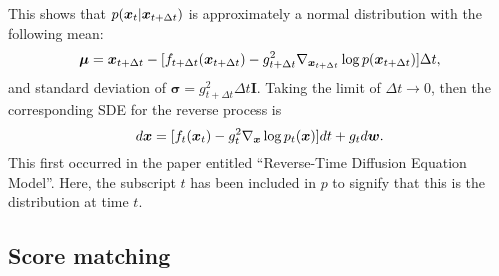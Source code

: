 This shows that $p(\bm{x}_{t}|\bm{x}_{t+\Delta t})$ is approximately a normal distribution with the following mean:
\begin{equation*}
    \bm{\mu}=\bm{x}_{t+\Delta t}-[f_{t+\Delta t}(\bm{x}_{t+\Delta t})-g_{t+\Delta t}^2 \nabla_{\bm{x}_{t+\Delta t}} \log p(\bm{x}_{t+\Delta t})]\Delta t,
\end{equation*}
and standard deviation of $\bm{\sigma}=g_{t+\Delta t}^2\Delta t\bm{I}$. Taking the limit of $\Delta t\to 0$, then the corresponding SDE for the reverse process is
\begin{equation}
    \label{eq:5.8}
    d\bm{x}=[f_t(\bm{x}_{t})-g_t^2\nabla_{\bm{x}}\log p_t(\bm{x})]dt +g_t d\bm{w}. 
\end{equation}
This first occurred in the paper entitled ``Reverse-Time Diffusion Equation Model''\cite{anderson1982reverse}. Here, the subscript $t$ has been included in $p$ to signify that this is the distribution at time $t$.

\subsection{Score matching}

